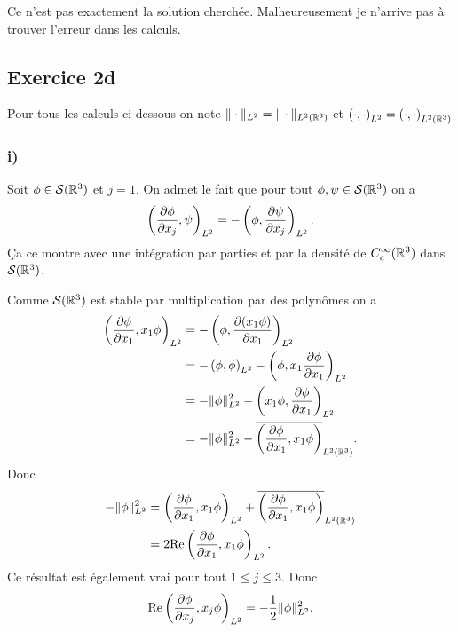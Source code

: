 Ce n'est pas exactement la solution cherchée. Malheureusement
je n'arrive pas à trouver l'erreur dans les calculs.


\subsection*{Exercice 2d}

Pour tous les calculs ci-dessous on note $\| \cdot \|_{L^2} = \| \cdot \|_{L^2(\mathbb{R}^3)}$
et $\left( \cdot, \cdot \right)_{L^2} = \left( \cdot, \cdot \right)_{L^2(\mathbb{R}^3)}$

\subsubsection*{i)}

Soit $\phi \in \mathcal{S}(\mathbb{R}^3)$ et $j = 1$.
On admet le fait que pour tout $\phi, \psi \in \mathcal{S}(\mathbb{R}^3)$ on a
\begin{align}
    \left( \frac{\partial \phi}{\partial x_j}, \psi \right)_{L^2}
    = -\left( \phi, \frac{\partial \psi}{\partial x_j} \right)_{L^2}.
\end{align}
%
Ça ce montre avec une intégration par parties et par la densité
de $C_c^\infty(\mathbb{R}^3)$ dans $\mathcal{S}(\mathbb{R}^3)$.

Comme $\mathcal{S}(\mathbb{R}^3)$ est stable par
multiplication par des polynômes on a
\begin{align}
    \left( \frac{\partial \phi}{\partial x_1}, x_1 \phi \right)_{L^2}
    &= -\left( \phi, \frac{\partial (x_1 \phi)}{\partial x_1} \right)_{L^2} \\
    &= -\left( \phi, \phi \right)_{L^2}
    - \left( \phi,  x_1 \frac{\partial \phi}{\partial x_1} \right)_{L^2} \\
    &= -\| \phi \|_{L^2}^2
    - \left( x_1 \phi, \frac{\partial \phi}{\partial x_1} \right)_{L^2} \\
    &= -\| \phi \|_{L^2}^2
    - \overline{\left( \frac{\partial \phi}{\partial x_1}, x_1 \phi \right)}_{L^2(\mathbb{R}^3)}.
\end{align}
%
Donc
\begin{align}
    -\| \phi \|_{L^2}^2 &=
    \left( \frac{\partial \phi}{\partial x_1}, x_1 \phi \right)_{L^2}
    + \overline{\left( \frac{\partial \phi}{\partial x_1}, x_1 \phi \right)}_{L^2(\mathbb{R}^3)} \\
    &= 2 \text{Re} \left( \frac{\partial \phi}{\partial x_1}, x_1 \phi \right)_{L^2}.
\end{align}
%
Ce résultat est également vrai pour tout $1 \leqslant j \leqslant 3$.
Donc
\begin{align}
    \text{Re} \left( \frac{\partial \phi}{\partial x_j}, x_j \phi \right)_{L^2}
    = -\frac{1}{2} \| \phi \|_{L^2}^2.
\end{align}

